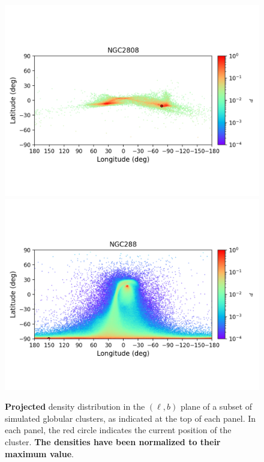 \begin{figure}
        \includegraphics[clip=true, trim = 0mm 20mm 0mm 10mm, width=1\columnwidth]{images/error_plots_NGC2808.png}
        \includegraphics[clip=true, trim = 0mm 20mm 0mm 10mm, width=1\columnwidth]{images/error_plots_NGC288.png}
        \caption[]{\textbf{Projected} density distribution in the $(\ell, b)$ plane of a subset of simulated globular clusters, as indicated at the top of each panel. In each panel, the red circle indicates the current position of the cluster. \textbf{The densities have been normalized to their maximum value}.}\label{stream4}
        \end{figure}
